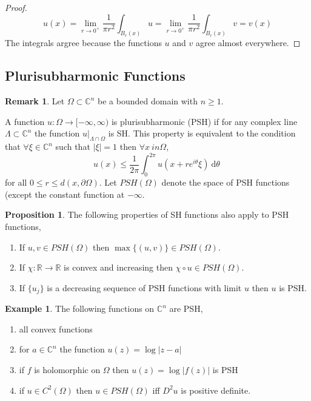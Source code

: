 \documentclass[12pt]{extarticle}
\newcommand{\R}{\mathbb{R}}
\newcommand{\C}{\mathbb{C}}
\renewcommand{\d}[1]{\: \mathrm{d}#1 \:}
\theoremstyle{definition}
\newtheorem{proposition}[theorem]{Proposition}
\newtheorem{example}[theorem]{Example}
\newtheorem{remark}{Remark}
\newenvironment{definition}[1][Definition:]{\begin{trivlist}
\item[\hskip \labelsep {\bfseries #1}]}{\end{trivlist}}
\begin{document}
\begin{proof}
\[ u(x) = \lim\limits_{r \to 0^{+}} \frac{1}{\pi r^2} \int_{B_r(x)} u = \lim_{r \to 0^{+}} \frac{1}{\pi r^2} \int_{B_r(x)} v = v(x) \]
The integrals argree because the functions $u$ and $v$ agree almost everywhere.
\end{proof}

\subsection{Plurisubharmonic Functions}

\begin{remark}
Let $\Omega \subset \C^n$ be a bounded domain with $n \ge 1$. 
\end{remark}

\begin{definition}
A function $u : \Omega \to [-\infty, \infty)$ is plurisubharmonic (PSH) if for any complex line $\Lambda \subset \C^n$ the function $u|_{\Lambda \cap \Omega}$ is SH. This property is equivalent to the condition that $\forall \xi \in \C^n$ such that $|\xi| = 1$ then $\forall x\ in \Omega$,
\[ u(x) \le \frac{1}{2 \pi} \int_0^{2 \pi} u(x + r e^{i \theta} \xi) \d{\theta} \]
for all $0 \le r \le d(x, \partial \Omega)$. Let $PSH(\Omega)$ denote the space of PSH functions (except the constant function at $-\infty$.
\end{definition}

\begin{proposition}
The following properties of SH functions also apply to PSH functions,
\begin{enumerate}
\item If $u,v \in PSH(\Omega)$ then $\max\{(u,v)\} \in PSH(\Omega)$.
\item If $\chi : \R \to \R$ is convex and increasing then $\chi \circ u \in PSH(\Omega)$.
\item If $\{ u_j \}$ is a decreasing sequence of PSH functions with limit $u$ then $u$ is PSH.
\end{enumerate}
\end{proposition}

\begin{example}
The following functions on $\C^n$ are PSH, 
\begin{enumerate}
\item all convex functions
\item for $a \in \C^n$ the function $u(z) = \log{|z - a|}$ 
\item if $f$ is holomorphic on $\Omega$ then $u(z) = \log{|f(z)|}$ is PSH
\item if $u \in C^2(\Omega)$ then $u \in PSH(\Omega)$ iff $D^2 u$ is positive definite. 
\end{enumerate}
\end{example}
\end{document}
